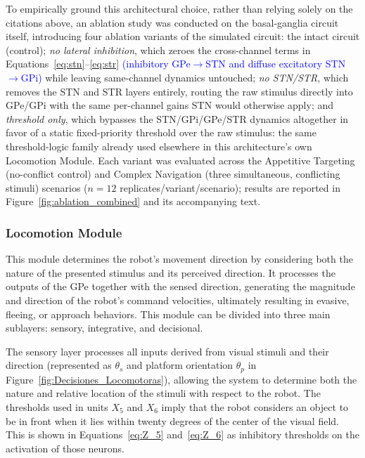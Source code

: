 \documentclass[preprint,12pt]{elsarticle}
\newcommand{\revblue}[1]{\textcolor{blue}{#1}}
\begin{document}
To empirically ground this architectural choice, rather than relying solely on the citations above, an ablation study was conducted on the basal-ganglia circuit itself, introducing four ablation variants of the simulated circuit: the intact circuit (control); \emph{no lateral inhibition}, which zeroes the cross-channel terms in Equations~\eqref{eq:stn}--\eqref{eq:str} \revblue{(inhibitory GPe$\rightarrow$STN and diffuse excitatory STN$\rightarrow$GPi)} while leaving same-channel dynamics untouched; \emph{no STN/STR}, which removes the STN and STR layers entirely, routing the raw stimulus directly into GPe/GPi with the same per-channel gains STN would otherwise apply; and \emph{threshold only}, which bypasses the STN/GPi/GPe/STR dynamics altogether in favor of a static fixed-priority threshold over the raw stimulus: the same threshold-logic family already used elsewhere in this architecture's own Locomotion Module. Each variant was evaluated across the Appetitive Targeting (no-conflict control) and Complex Navigation (three simultaneous, conflicting stimuli) scenarios ($n=12$ replicates/variant/scenario); results are reported in Figure~\ref{fig:ablation_combined} and its accompanying text.

\subsubsection{Locomotion Module}

This module determines the robot's movement direction by considering both the nature of the presented stimulus and its perceived direction. It processes the outputs of the GPe together with the sensed direction, generating the magnitude and direction of the robot's command velocities, ultimately resulting in evasive, fleeing, or approach behaviors. This module can be divided into three main sublayers: sensory, integrative, and decisional. 

The sensory layer processes all inputs derived from visual stimuli and their direction (represented as $\theta_s$ and platform orientation $\theta_p$ in Figure~\ref{fig:Decisiones_Locomotoras}), allowing the system to determine both the nature and relative location of the stimuli with respect to the robot. The thresholds used in units $X_5$ and $X_6$ imply that the robot considers an object to be in front when it lies within twenty degrees of the center of the visual field. This is shown in Equations~\eqref{eq:Z_5} and~\eqref{eq:Z_6} as inhibitory thresholds on the activation of those neurons.
\end{document}
